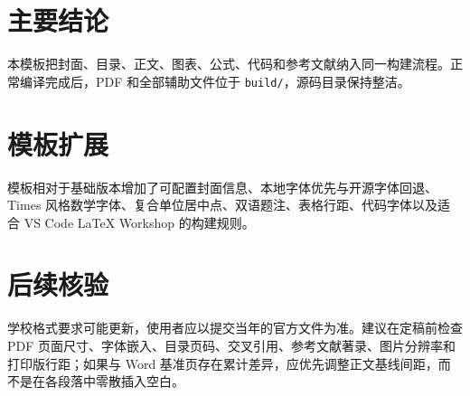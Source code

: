 \begin{conclusion}

\section*{主要结论}
本模板把封面、目录、正文、图表、公式、代码和参考文献纳入同一构建流程。正常编译完成后，PDF 和全部辅助文件位于 \texttt{build/}，源码目录保持整洁。

\section*{模板扩展}
模板相对于基础版本增加了可配置封面信息、本地字体优先与开源字体回退、Times 风格数学字体、复合单位居中点、双语题注、表格行距、代码字体以及适合 VS Code LaTeX Workshop 的构建规则。

\section*{后续核验}
学校格式要求可能更新，使用者应以提交当年的官方文件为准。建议在定稿前检查 PDF 页面尺寸、字体嵌入、目录页码、交叉引用、参考文献著录、图片分辨率和打印版行距；如果与 Word 基准页存在累计差异，应优先调整正文基线间距，而不是在各段落中零散插入空白。
\end{conclusion}
